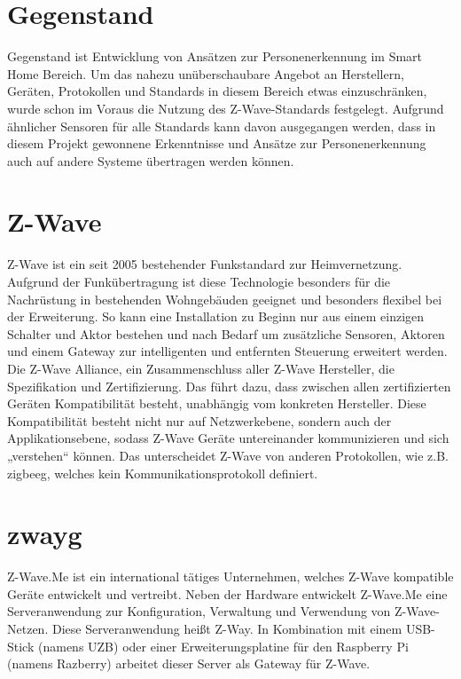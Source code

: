 \documentclass[12pt, oneside, smallheadings]{scrbook}
\begin{document}
\section{Gegenstand}

Gegenstand ist Entwicklung von Ansätzen zur Personenerkennung im Smart Home Bereich. Um das nahezu unüberschaubare Angebot an Herstellern, Geräten, Protokollen und Standards in diesem Bereich etwas einzuschränken, wurde schon im Voraus die Nutzung des Z-Wave-Standards festgelegt. Aufgrund ähnlicher Sensoren für alle Standards kann davon ausgegangen werden, dass in diesem Projekt gewonnene Erkenntnisse und Ansätze zur Personenerkennung auch auf andere Systeme übertragen werden können.

\section{Z-Wave}

Z-Wave ist ein seit 2005 bestehender Funkstandard zur Heimvernetzung. Aufgrund der Funkübertragung ist diese Technologie besonders für die Nachrüstung in bestehenden Wohngebäuden geeignet und besonders flexibel bei der Erweiterung. So kann eine Installation zu Beginn nur aus einem einzigen Schalter und Aktor bestehen und nach Bedarf um zusätzliche Sensoren, Aktoren und einem Gateway zur intelligenten und entfernten Steuerung erweitert werden.
Die Z-Wave Alliance, ein Zusammenschluss aller Z-Wave Hersteller, die Spezifikation und Zertifizierung. Das führt dazu, dass zwischen allen zertifizierten Geräten Kompatibilität besteht, unabhängig vom konkreten Hersteller. Diese Kompatibilität besteht nicht nur auf Netzwerkebene, sondern auch der Applikationsebene, sodass Z-Wave Geräte untereinander kommunizieren und sich „verstehen“ können. Das unterscheidet Z-Wave von anderen Protokollen, wie z.B. \gls{zigbeeg}, welches kein Kommunikationsprotokoll definiert.

\section{\gls{zwayg}}

Z-Wave.Me ist ein international tätiges Unternehmen, welches Z-Wave kompatible Geräte entwickelt und vertreibt. Neben der Hardware entwickelt Z-Wave.Me eine Serveranwendung zur Konfiguration, Verwaltung und Verwendung von Z-Wave-Netzen. Diese Serveranwendung heißt Z-Way. In Kombination mit einem USB-Stick (namens UZB) oder einer Erweiterungsplatine für den Raspberry Pi (namens Razberry) arbeitet dieser Server als Gateway für Z-Wave.
\end{document}
